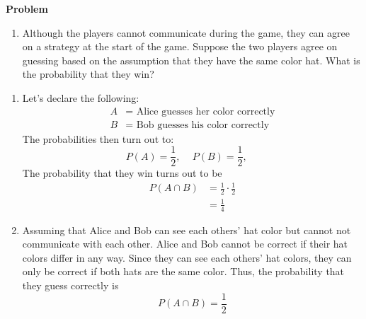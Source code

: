 \documentclass[12pt]{article}
\newenvironment{Ex}{\textbf{Problem}\vspace{.75em}\\}{}
\begin{document}
\begin{enumerate}
\begin{Ex}
\begin{enumerate}
    \item Although the players cannot communicate during the game,
      they can agree on a strategy at the start of the game. Suppose
      the two players agree on guessing based on the assumption that
      they have the same color hat. What is the probability that they
      win?
    \end{enumerate}
    \begin{solution} \hfill
      \begin{enumerate}
      \item Let's declare the following:
        \begin{equation}
          \label{eq:2-var-declaration}
          \begin{aligned}
            A &= \text{ Alice guesses her color correctly} \\
            B &= \text{ Bob guesses his color correctly}
          \end{aligned}
        \end{equation}
        The probabilities then turn out to:
        \begin{equation}
          \label{eq:1-prob-declaration}
          P(A) = \frac{1}{2} \text{, } \quad
          P(B) = \frac{1}{2} \text{, } \quad
        \end{equation}
        The probability that they win turns out to be 
        \begin{equation}
          \label{eq:2a-answer}
          \begin{aligned}
            P(A \cap B) &= \frac{1}{2} \cdot \frac{1}{2} \\
            &= \frac{1}{4}
          \end{aligned}
        \end{equation}
      \item Assuming that Alice and Bob can see each others' hat color
        but cannot not communicate with each other. Alice and Bob
        cannot be correct if their hat colors differ in any way. Since
        they can see each others' hat colors, they can only be correct
        if both hats are the same color. Thus, the probability that
        they guess correctly is
        \begin{equation}
          \label{eq:2b-answer}
          P(A \cap B) = \frac{1}{2}
        \end{equation}
      \end{enumerate}
    \end{solution}
  \end{Ex}

\end{enumerate}
\end{document}
